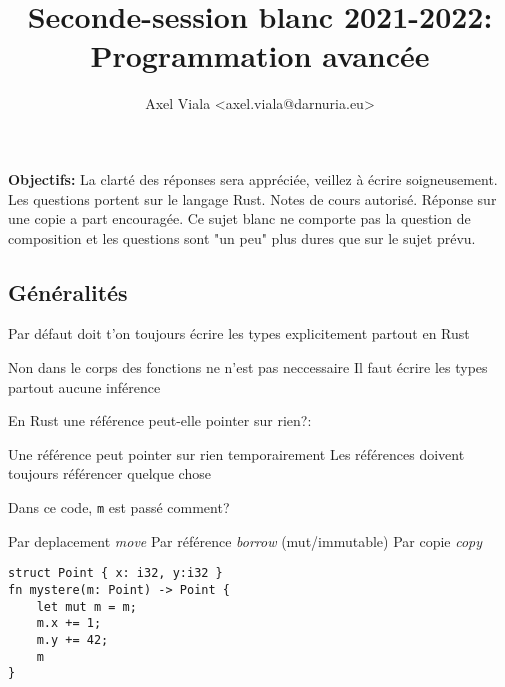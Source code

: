 \documentclass[11pt,a4paper,addpoint]{exam}
\author{\normalsize{Axel Viala <axel.viala@darnuria.eu>}}
\title{\normalsize{\textbf{Seconde-session blanc 2021-2022: Programmation avancée}}}
\begin{document}
  \maketitle
  \begin{multicols}{2}

  \end{multicols}
  \textbf{Objectifs:} La clarté des réponses sera appréciée, veillez à écrire soigneusement. Les questions portent sur le langage Rust.
  Notes de cours autorisé. Réponse sur une copie a part encouragée. Ce sujet blanc ne comporte pas la question de composition et les questions sont "un peu" plus dures
  que sur le sujet prévu.
  \newline
  \begin{questions}

    \section{Généralités}


    \question[1] Par défaut doit t'on toujours écrire les types explicitement partout en Rust
    \begin{checkboxes}
        \CorrectChoice Non dans le corps des fonctions ne n'est pas neccessaire
        \choice Il faut écrire les types partout aucune inférence
    \end{checkboxes}

\question[1] En Rust une référence peut-elle pointer sur rien?:
 \begin{checkboxes}
    \choice Une référence peut pointer sur rien temporairement
    \CorrectChoice Les références doivent toujours référencer quelque chose
\end{checkboxes}

\question[1] Dans ce code, \texttt{m} est passé comment?
\begin{checkboxes}
    \CorrectChoice Par deplacement \textit{move}
    \choice Par référence \textit{borrow} (mut/immutable)
    \choice Par copie \textit{copy}
\end{checkboxes}
\begin{verbatim}
struct Point { x: i32, y:i32 }
fn mystere(m: Point) -> Point {
    let mut m = m;
    m.x += 1;
    m.y += 42;
    m
}
\end{verbatim}


\end{questions}
\end{document}
